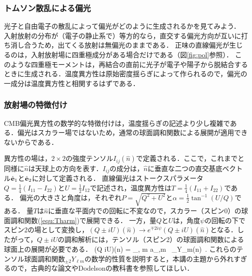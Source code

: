 \subsubsection{トムソン散乱による偏光}

光子と自由電子の散乱によって偏光がどのように生成されるかを見てみよう．
入射放射の分布が（電子の静止系で）等方的なら，直交する偏光方向が互いに打ち消し合うため，出てくる放射は無偏光のままである．
正味の直線偏光が生じるのは，入射放射場に四重極成分がある場合だけである（図\ref{fig:pol}参照）．
このような四重極モーメントは，再結合の直前に光子が電子や陽子から脱結合するときに生成される．温度異方性は原始密度揺らぎによって作られるので，偏光の一成分は温度異方性と相関するはずである．


\subsubsection{放射場の特徴付け}

CMB偏光異方性の数学的な特徴付けは，温度揺らぎの記述より少し複雑である．偏光はスカラー場ではないため，通常の球面調和関数による展開が適用できないからである．

異方性の場は，$2\times 2$の強度テンソル$I_{ij}(\hat n)$で定義される．ここで，これまでと同様に$\hat n$は天球上の方向を表す．$I_{ij}$の成分は，$\hat n$に垂直な二つの直交基底ベクトル$\hat{\bf e}_1$と$\hat {\bf e}_2$に対して定義される．
直線偏光はストークスパラメータ$Q = \frac{1}{4}(I_{11}-I_{22})$と$U=\frac{1}{2} I_{12}$で記述され，温度異方性は$T = \frac{1}{4} (I_{11}+I_{22})$である．
偏光の大きさと角度は，それぞれ$P =\sqrt{Q^2 +U^2}$と$\alpha = \frac{1}{2} \tan^{-1}(U/Q)$である．
量$T$は$\hat n$に垂直な平面内での回転に不変なので，スカラー（スピン0）の球面調和関数(\ref{equ:Tharm})で展開できる．
一方，量$Q$と$U$は，角度$\psi$の回転の下でスピン2の場として変換し，$(Q \pm iU)(\hat n) \to e^{\mp 2 i \psi} (Q \pm i U)(\hat n)$となる．したがって，$Q \pm i U$の調和解析には，テンソル（スピン2）の球面調和関数による球面上の展開が必要である\cite{Kamionkowski:1996ks, Zaldarriaga:1996xe, NewmanPenrose}．
\beq
(Q \pm iU)(\hat n) = \sum_{\ell, m}  a_{,\ell m} \, {}_{}Y_{\ell m}(\hat n)\, .
\eeq
これらのテンソル球面調和関数${}_{\pm 2}Y_{\ell m}$の数学的性質を説明すると，本講の主題から外れすぎるので，古典的な論文\cite{Kamionkowski:1996ks, Zaldarriaga:1996xe}やDodelsonの教科書\cite{Dodelson}を参照してほしい．

